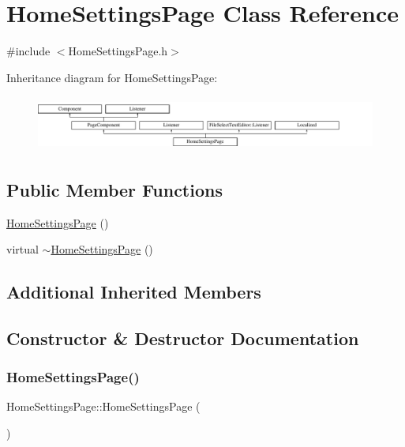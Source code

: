 \hypertarget{classHomeSettingsPage}{}\section{Home\+Settings\+Page Class Reference}
\label{classHomeSettingsPage}


{\ttfamily \#include $<$Home\+Settings\+Page.\+h$>$}

Inheritance diagram for Home\+Settings\+Page\+:\begin{figure}[H]
\begin{center}
\leavevmode
\includegraphics[height=1.836066cm]{classHomeSettingsPage}
\end{center}
\end{figure}
\subsection*{Public Member Functions}
\begin{DoxyCompactItemize}
\item 
\mbox{\hyperlink{classHomeSettingsPage_a8dfed71c4796b6301f38d8a504bbd453}{Home\+Settings\+Page}} ()
\item 
virtual \mbox{\hyperlink{classHomeSettingsPage_a4017e048f7a23fe23418f1f8eb2851dc}{$\sim$\+Home\+Settings\+Page}} ()
\end{DoxyCompactItemize}
\subsection*{Additional Inherited Members}


\subsection{Constructor \& Destructor Documentation}
\mbox{\label{classHomeSettingsPage_a8dfed71c4796b6301f38d8a504bbd453}} 
\subsubsection{\texorpdfstring{Home\+Settings\+Page()}{HomeSettingsPage()}}
{\footnotesize\ttfamily Home\+Settings\+Page\+::\+Home\+Settings\+Page (\begin{DoxyParamCaption}{ }\end{DoxyParamCaption})}

